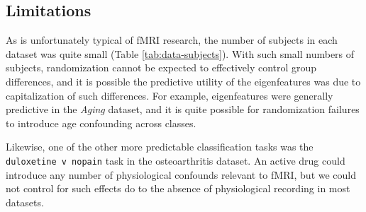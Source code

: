 \documentclass[12pt]{spieman}  %
\newcommand{\code}[1]{\small\texttt{#1}\normalsize}
\begin{document}
\begin{spacing}{2}


\subsection{Limitations}
As is unfortunately typical of fMRI research\cite{turnerSmallSampleSizes2018},
the number of subjects in each dataset was quite small (Table
\ref{tab:data-subjects}). With such small numbers of subjects, randomization
cannot be expected to effectively control group differences, and it is possible
the predictive utility of the eigenfeatures was due to capitalization of such
differences. For example, eigenfeatures were generally predictive in the
\textit{Aging} dataset, and it is quite possible for randomization failures to
introduce age confounding across classes.

Likewise, one of the other more predictable classification tasks was the
\code{duloxetine v nopain} task in the osteoarthritis dataset. An active drug
could introduce any number of physiological confounds relevant to
fMRI\cite{murphyRestingstateFMRIConfounds2013}, but we could not control for
such effects do to the absence of physiological recording in most datasets.


\end{spacing}
\end{document}
